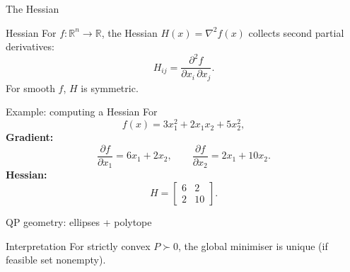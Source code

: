 \documentclass[aspectratio=169,10pt]{beamer}
\newcommand{\R}{\mathbb{R}}
\begin{document}
\begin{frame}{The Hessian}
\begin{defnbox}{Hessian}
For $f:\R^n\to\R$, the Hessian $H(x)=\nabla^2 f(x)$ collects second partial derivatives:
\begin{equation*}
H_{ij}=\frac{\partial^2 f}{\partial x_i\,\partial x_j}.
\end{equation*}
For smooth $f$, $H$ is symmetric.
\end{defnbox}
\end{frame}

\begin{frame}{Example: computing a Hessian}
For
\begin{equation*}
f(x)=3x_1^2 + 2x_1x_2 + 5x_2^2,
\end{equation*}
\textbf{Gradient:}
\begin{equation*}
\frac{\partial f}{\partial x_1}=6x_1+2x_2,\qquad
\frac{\partial f}{\partial x_2}=2x_1+10x_2.
\end{equation*}
\textbf{Hessian:}
\begin{equation*}
H=\begin{bmatrix}
6 & 2\\
2 & 10
\end{bmatrix}.
\end{equation*}
\end{frame}

\begin{frame}{QP geometry: ellipses + polytope}
\begin{center}
\end{center}

\begin{notebox}{Interpretation}
For strictly convex $P\succ 0$, the global minimiser is unique (if feasible set nonempty).
\end{notebox}
\end{frame}
\end{document}
